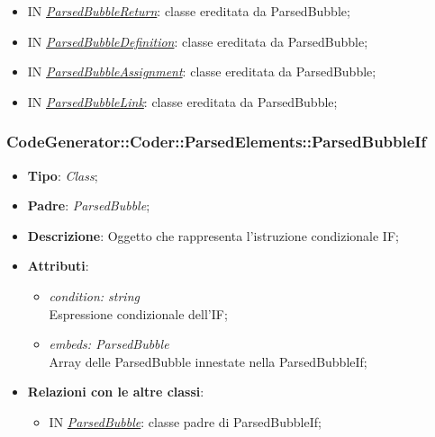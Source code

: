 \documentclass[../DefinizioneDiProdotto.tex]{subfiles}
\begin{document}
\begin{itemize}
\begin{itemize}
				\item IN \hyperlink{SWEDesigner::Server::CodeGenerator::Coder::ParsedElements::ParsedBubbleReturn}{\emph{ParsedBubbleReturn}}: classe ereditata da ParsedBubble;
				\item IN \hyperlink{SWEDesigner::Server::CodeGenerator::Coder::ParsedElements::ParsedBubbleDefinition}{\emph{ParsedBubbleDefinition}}: classe ereditata da ParsedBubble;
				\item IN \hyperlink{SWEDesigner::Server::CodeGenerator::Coder::ParsedElements::ParsedBubbleAssignment}{\emph{ParsedBubbleAssignment}}: classe ereditata da ParsedBubble;
				\item IN \hyperlink{SWEDesigner::Server::CodeGenerator::Coder::ParsedElements::ParsedBubbleLink}{\emph{ParsedBubbleLink}}: classe ereditata da ParsedBubble;  
			\end{itemize}
		\end{itemize}	
	
		\subsubsection{CodeGenerator::Coder::ParsedElements::ParsedBubbleIf}
		\hypertarget{SWEDesigner::Server::CodeGenerator::Coder::ParsedElements::ParsedBubbleIf}{}
		\begin{itemize}
			\item \textbf{Tipo}: \emph{Class};
			\item \textbf{Padre}: \emph{ParsedBubble};
			\item \textbf{Descrizione}: Oggetto che rappresenta l'istruzione condizionale IF;
			\item \textbf{Attributi}:
			\begin{itemize}
				\item \emph{condition: string} \\
				Espressione condizionale dell'IF;
				\item \emph{embeds: ParsedBubble} \\
				Array delle ParsedBubble innestate nella ParsedBubbleIf;
			\end{itemize}
			\item \textbf{Relazioni con le altre classi}:	
			\begin{itemize}
				\item IN \hyperlink{SWEDesigner::Server::CodeGenerator::Coder::ParsedElements::ParsedBubble}{\emph{ParsedBubble}}: classe padre di ParsedBubbleIf; 
			\end{itemize}
		\end{itemize}	
	
\end{document}
